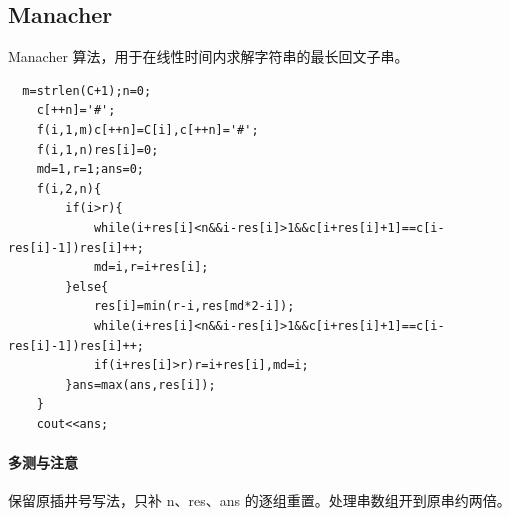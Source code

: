 \subsection{Manacher}
Manacher 算法，用于在线性时间内求解字符串的最长回文子串。
\begin{lstlisting}
  m=strlen(C+1);n=0;
	c[++n]='#';
	f(i,1,m)c[++n]=C[i],c[++n]='#';
	f(i,1,n)res[i]=0;
    md=1,r=1;ans=0;
	f(i,2,n){
		if(i>r){
			while(i+res[i]<n&&i-res[i]>1&&c[i+res[i]+1]==c[i-res[i]-1])res[i]++;
			md=i,r=i+res[i];
		}else{
			res[i]=min(r-i,res[md*2-i]);
			while(i+res[i]<n&&i-res[i]>1&&c[i+res[i]+1]==c[i-res[i]-1])res[i]++;
			if(i+res[i]>r)r=i+res[i],md=i;
		}ans=max(ans,res[i]);
	}
	cout<<ans;
\end{lstlisting}

\paragraph{多测与注意} 保留原插井号写法，只补 n、res、ans 的逐组重置。处理串数组开到原串约两倍。
